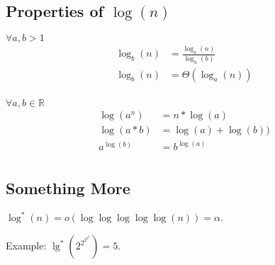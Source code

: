 \subsection{Properties of $\log(n)$}

\begin{theorem}
$\forall{a,b}  > 1$
\[
\begin{split}
\log_b(n) & = \frac{\log_a(n)}{\log_a(b)} \\
\log_b(n) & = \Theta({\log_a(n)}) \\
\end{split}
\]
\end{theorem}

\begin{theorem}
$\forall{a,b} \in \mathbb{R}$
\[\begin{split}
\log(a^n) & = n*\log(a)
\\
\log(a*b) & = \log(a) + \log(b))
\\
a^{\log(b)} & = b^{\log(a)}
\\
\end{split}\]
\end{theorem}


\subsection{Something More}


\begin{definition}
$\log^*(n) = o(\log\log\log\log\log(n)) = \alpha$.
\end{definition}


Example: $\lg^*(2^{2^{2^{2^{2}}}}) = 5$.

